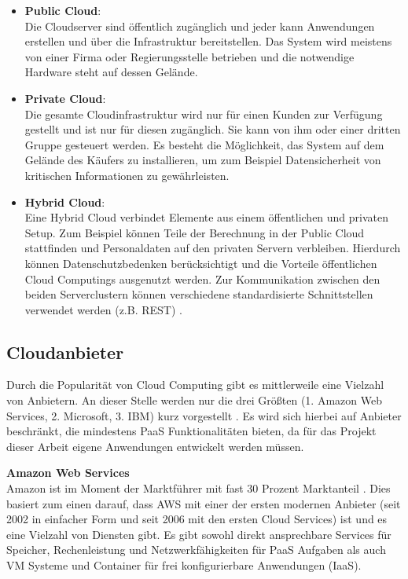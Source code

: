 \begin{itemize}
	\item \textbf{Public Cloud}:\\
	Die Cloudserver sind öffentlich zugänglich und jeder kann Anwendungen erstellen und über die Infrastruktur bereitstellen. Das System wird meistens von einer Firma oder Regierungsstelle betrieben und die notwendige Hardware steht auf dessen Gelände. 
	\item \textbf{Private Cloud}:\\
	Die gesamte Cloudinfrastruktur wird nur für einen Kunden zur Verfügung gestellt und ist nur für diesen zugänglich. Sie kann von ihm oder einer dritten Gruppe gesteuert werden. Es besteht die Möglichkeit, das System auf dem Gelände des Käufers zu installieren, um zum Beispiel Datensicherheit von kritischen Informationen zu gewährleisten. 
	\item \textbf{Hybrid Cloud}:\\
	Eine Hybrid Cloud verbindet Elemente aus einem öffentlichen und privaten Setup. Zum Beispiel können Teile der Berechnung in der Public Cloud stattfinden und Personaldaten auf den privaten Servern verbleiben. Hierdurch können Datenschutzbedenken berücksichtigt und die Vorteile öffentlichen Cloud Computings ausgenutzt werden. Zur Kommunikation zwischen den beiden Serverclustern können verschiedene standardisierte Schnittstellen verwendet werden (z.B. REST)  \parencite{rafaels.2015}.
\end{itemize}

\subsection{Cloudanbieter} \label{subsec:cloudprovider}
Durch die Popularität von Cloud Computing gibt es mittlerweile eine Vielzahl von Anbietern. An dieser Stelle werden nur die drei Größten (1. Amazon Web Services, 2. Microsoft, 3. IBM) kurz vorgestellt \parencite{statistia.2016}. Es wird sich hierbei auf Anbieter beschränkt, die mindestens \acs{PaaS} Funktionalitäten bieten, da für das Projekt dieser Arbeit eigene Anwendungen entwickelt werden müssen.


\textbf{Amazon Web Services}\\
Amazon ist im Moment der Marktführer mit fast 30 Prozent Marktanteil \parencite{statistia.2016}. Dies basiert zum einen darauf, dass \ac{AWS} mit einer der ersten modernen Anbieter (seit 2002 in einfacher Form und seit 2006 mit den ersten Cloud Services) ist und es eine Vielzahl von Diensten gibt. Es gibt sowohl direkt ansprechbare Services für Speicher, Rechenleistung und Netzwerkfähigkeiten für \acs{PaaS} Aufgaben als auch VM Systeme und Container für frei konfigurierbare Anwendungen (\acs{IaaS}).

